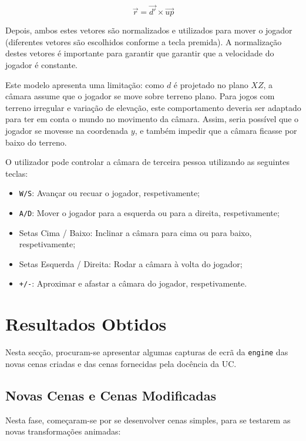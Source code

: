 \documentclass[12pt, a4paper]{article}
\begin{document}
$$
\vec{r} = \vec{d'} \times \vec{up}
$$

Depois, ambos estes vetores são normalizados e utilizados para mover o jogador (diferentes vetores
são escolhidos conforme a tecla premida). A normalização destes vetores é importante para garantir
que garantir que a velocidade do jogador é constante.

Este modelo apresenta uma limitação: como $d$ é projetado no plano $XZ$, a câmara assume que o
jogador se move sobre terreno plano. Para jogos com terreno irregular e variação de elevação, este
comportamento deveria ser adaptado para ter em conta o mundo no movimento da câmara. Assim, seria
possível que o jogador se movesse na coordenada $y$, e também impedir que a câmara ficasse por baixo
do terreno.

O utilizador pode controlar a câmara de terceira pessoa utilizando as seguintes teclas:

\begin{itemize}
    \item \texttt{W/S}: Avançar ou recuar o jogador, respetivamente;
    \item \texttt{A/D}: Mover o jogador para a esquerda ou para a direita, respetivamente;
    \item Setas Cima / Baixo: Inclinar a câmara para cima ou para baixo, respetivamente;
    \item Setas Esquerda / Direita: Rodar a câmara à volta do jogador;
    \item \texttt{+/-}: Aproximar e afastar a câmara do jogador, respetivamente.
\end{itemize}

\section{Resultados Obtidos}

Nesta secção, procuram-se apresentar algumas capturas de ecrã da \texttt{engine} das novas cenas
criadas e das cenas fornecidas pela docência da UC.

\subsection{Novas Cenas e Cenas Modificadas}

Nesta fase, começaram-se por se desenvolver cenas simples, para se testarem as novas transformações
animadas:
\end{document}
